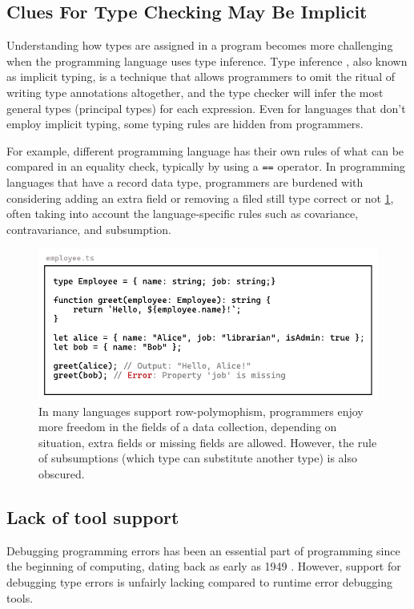 \subsection{Clues For Type Checking May Be Implicit}
Understanding how types are assigned in a program becomes more challenging when the programming language uses type inference. Type inference \cite{Damas1982-sc},  also known as implicit typing, is a technique that allows programmers to omit the ritual of writing type annotations altogether, and the type checker will infer the most general types (principal types) for each expression. Even for languages that don't employ implicit typing, some typing rules are hidden from programmers.

For example, different programming language has their own rules of what can be compared in an equality check, typically by using a \texttt{==} operator. In programming languages that have a record data type, programmers are burdened with considering adding an extra field or removing a filed still type correct or not \ref{fig:row-polymophism}, often taking into account the language-specific rules such as covariance, contravariance, and subsumption.

\begin{figure}[hbt]
  \includegraphics[width=\linewidth]{RowPolymorphism.pdf}
  \caption{
    \label{fig:row-polymophism}
   In many languages support row-polymophism, programmers enjoy more freedom in the fields of a data collection,  depending on situation,  extra fields or missing fields are allowed. However, the rule of subsumptions (which type can substitute another type) is also obscured.
    }
\end{figure}


\subsection{Lack of tool support}
Debugging programming errors has been an essential part of programming since the beginning of computing, dating back as early as 1949 \cite{Campbell-Kelly1992-rn}. However, support for debugging type errors is unfairly lacking compared to runtime error debugging tools. 

